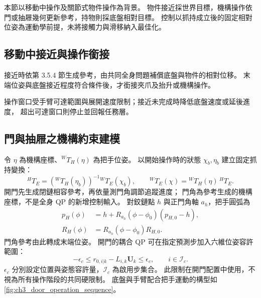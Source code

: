 本節以移動中操作\cite{burgess2023motm}及關節式物件操作\cite{mittal2022articulated}為背景。
物件接近採世界目標，機構操作依門或抽屜幾何更新參考，持物則採底盤相對目標。
控制以抓持成立後的固定相對位姿為運動學前提，未將接觸力與滑移納入最佳化。

\subsection{移動中接近與操作銜接}
\label{subsec:moving_approach_grasp}

接近時依第 3.5.4 節生成參考，由共同全身問題補償底盤與物件的相對位移。
末端位姿與底盤接近程度符合條件後，才銜接夾爪及抬升或機構操作。

操作窗口受手臂可達範圍與展開速度限制；接近未完成時降低底盤速度或延後進度，
超出可達窗口則停止並回報任務層。

\subsection{門與抽屜之機構約束建模}
\label{subsec:articulated_object_constraints}

令 $\eta$ 為機構座標、$ {}^WT_H(\eta)$ 為把手位姿。
以開始操作時的狀態 $\chi_b,\eta_b$ 建立固定抓持變換：
\begin{equation}
    {}^HT_E=({}^WT_H(\eta_b))^{-1}{}^WT_E(\chi_b),
    \qquad
    {}^WT_E(\chi)={}^WT_H(\eta)\,{}^HT_E .
    \label{eq:ch3_grasp_closed_chain}
\end{equation}
開門先生成閉鏈相容參考，再依量測門角調節追蹤進度；
門角為參考生成的機構座標，不是全身 QP 的新增控制輸入。
對鉸鏈點 $h$ 與正門角軸 $a_h$，把手圓弧為
\begin{equation}
    \begin{aligned}
        p_H(\phi)&=h+R_{a_h}(\phi-\phi_0)(p_{H,0}-h),\\
        R_H(\phi)&=R_{a_h}(\phi-\phi_0)R_{H,0}.
    \end{aligned}
    \label{eq:ch3_revolute_handle_model}
\end{equation}
門角參考由此轉成末端位姿。
開門的耦合 QP 可在指定預測步加入六維位姿容許範圍：
\begin{equation}
    -\epsilon_c\leq r_{0,i|k}-L_{i,k}\mathbf U_k\leq\epsilon_c,
    \qquad i\in\mathcal I_c .
    \label{eq:ch3_contact_pose_tube}
\end{equation}
$\epsilon_c$ 分別設定位置與姿態容許量，$\mathcal I_c$ 為啟用步集合。
此限制在開門配置中使用，不視為所有操作階段的共同硬限制。
底盤與手臂配合把手運動的構型如\cref{fig:ch3_door_operation_sequence}。


